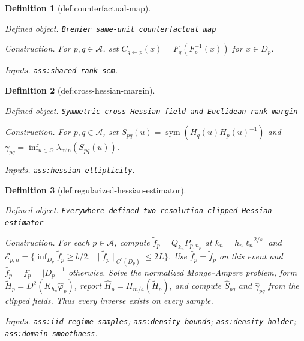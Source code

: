 \documentclass{article}
\newtheorem{definition}{Definition}
\begin{document}
\begin{definition}[def:counterfactual-map]\label{def:counterfactual-map}
\par\smallskip\noindent\emph{Defined object.} \texttt{Brenier same-\allowbreak{}unit counterfactual map}
\par\smallskip\noindent\emph{Construction.} For \(p,q\in\mathcal A\), set \(C_{q\leftarrow p}(x)=F_q(F_p^{-1}(x))\) for \(x\in D_p\).
\par\smallskip\noindent\emph{Inputs.} \texttt{ass:\allowbreak{}shared-\allowbreak{}rank-\allowbreak{}scm}.
\end{definition}

\begin{definition}[def:cross-hessian-margin]\label{def:cross-hessian-margin}
\par\smallskip\noindent\emph{Defined object.} \texttt{Symmetric cross-\allowbreak{}Hessian field and Euclidean rank margin}
\par\smallskip\noindent\emph{Construction.} For \(p,q\in\mathcal A\), set \(S_{pq}(u)=\operatorname{sym}(H_q(u)H_p(u)^{-1})\) and \(\gamma_{pq}=\inf_{u\in\Omega}\lambda_{\min}(S_{pq}(u))\).
\par\smallskip\noindent\emph{Inputs.} \texttt{ass:\allowbreak{}hessian-\allowbreak{}ellipticity}.
\end{definition}

\begin{definition}[def:regularized-hessian-estimator]\label{def:regularized-hessian-estimator}
\par\smallskip\noindent\emph{Defined object.} \texttt{Everywhere-\allowbreak{}defined two-\allowbreak{}resolution clipped Hessian estimator}
\par\smallskip\noindent\emph{Construction.} For each \(p\in\mathcal A\), compute \(\widetilde f_p=Q_{k_n}P_{p,n_p}\) at \(k_n=h_n\ell_n^{-2/s}\) and \(\mathcal E_{p,n}=\{\inf_{D_p}\widetilde f_p\ge b/2,\ \lVert\widetilde f_p\rVert_{C^r(D_p)}\le2L\}\). Use \(\widehat f_p=\widetilde f_p\) on this event and \(\widehat f_p=f_p^{\circ}=\lvert D_p\rvert^{-1}\) otherwise. Solve the normalized Monge--Ampere problem, form \(\widetilde H_p=D^2(K_{h_n}\widehat\varphi_p)\), report \(\widehat H_p=\Pi_{m/4}(\widetilde H_p)\), and compute \(\widehat S_{pq}\) and \(\widehat\gamma_{pq}\) from the clipped fields. Thus every inverse exists on every sample.
\par\smallskip\noindent\emph{Inputs.} \texttt{ass:\allowbreak{}iid-\allowbreak{}regime-\allowbreak{}samples}; \texttt{ass:\allowbreak{}density-\allowbreak{}bounds}; \texttt{ass:\allowbreak{}density-\allowbreak{}holder}; \texttt{ass:\allowbreak{}domain-\allowbreak{}smoothness}.
\end{definition}
\end{document}

